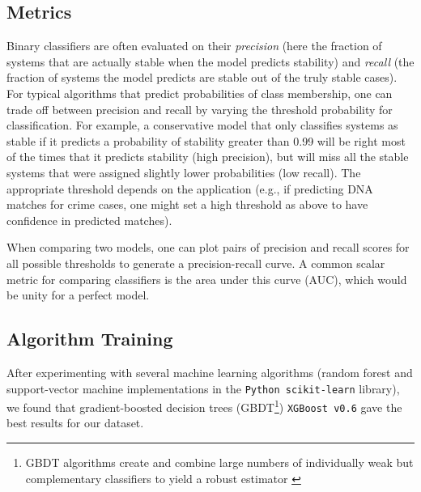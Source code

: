 \subsection{Metrics} \label{metrics}
Binary classifiers are often evaluated on their {\it precision} (here the fraction of systems that are actually stable when the model predicts stability) and {\it recall} (the fraction of systems the model predicts are stable out of the truly stable cases).  
For typical algorithms that predict probabilities of class membership, one can trade off between precision and recall by varying the threshold probability for classification.
For example, a conservative model that only classifies systems as stable if it predicts a probability of stability greater than 0.99 will be right most of the times that it predicts stability (high precision), but will miss all the stable systems that were assigned slightly lower probabilities (low recall).
The appropriate threshold depends on the application (e.g., if predicting DNA matches for crime cases, one might set a high threshold as above to have confidence in predicted matches).

When comparing two models, one can plot pairs of precision and recall scores for all possible thresholds to generate a precision-recall curve.
A common scalar metric for comparing classifiers is the area under this curve (AUC), which would be unity for a perfect model.

\subsection{Algorithm Training} \label{training}
After experimenting with several machine learning algorithms (random forest and support-vector machine implementations in the {\tt Python scikit-learn} library), we found that gradient-boosted decision trees (GBDT\footnote{GBDT algorithms create and combine large numbers of individually weak but complementary classifiers to yield a robust estimator \citep{Friedman01}}) {\tt XGBoost v0.6} \citep{Chen16} gave the best results for our dataset.

